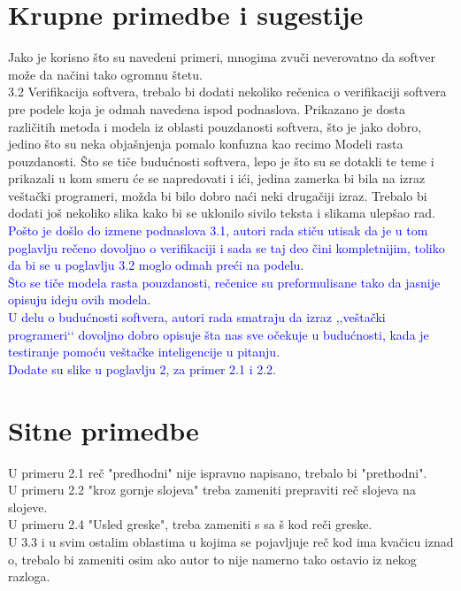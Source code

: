 \documentclass[a4paper]{report}
\newcommand{\odgovor}[1]{\textcolor{blue}{#1}}
\begin{document}
\section{Krupne primedbe i sugestije}
Jako je korisno što su navedeni primeri, mnogima zvuči neverovatno da softver može da načini tako ogromnu štetu.\\
3.2 Verifikacija softvera, trebalo bi dodati nekoliko rečenica o verifikaciji softvera pre podele koja je odmah navedena ispod podnaslova. Prikazano je dosta različitih metoda i modela iz oblasti pouzdanosti softvera, što je jako dobro, jedino što su neka objašnjenja pomalo konfuzna kao recimo Modeli rasta pouzdanosti. Što se tiče budućnosti softvera, lepo je što su se dotakli te teme i prikazali u kom smeru će se napredovati i ići, jedina zamerka bi bila na izraz veštački programeri, možda bi bilo dobro naći neki drugačiji izraz. Trebalo bi dodati još nekoliko slika kako bi se uklonilo sivilo teksta i slikama ulepšao rad.
\\

\odgovor{
Pošto je došlo do izmene podnaslova 3.1, autori rada stiču utisak da je u tom poglavlju rečeno dovoljno o verifikaciji i sada se taj deo čini kompletnijim, toliko da bi se u poglavlju 3.2 moglo odmah preći na podelu.\\
Što se tiče modela rasta pouzdanosti, rečenice su preformulisane tako da jasnije opisuju ideju ovih modela.\\
U delu o budućnosti softvera, autori rada smatraju da izraz ,,veštački programeri‘‘ dovoljno dobro opisuje šta nas sve očekuje u budućnosti, kada je testiranje pomoću veštačke inteligencije u pitanju.\\
Dodate su slike u poglavlju 2, za primer 2.1 i 2.2.
}

\section{Sitne primedbe}
U primeru 2.1 reč "predhodni" nije ispravno napisano, trebalo bi "prethodni".\\
U primeru 2.2 "kroz gornje slojeva" treba zameniti prepraviti reč slojeva na slojeve.\\
U primeru 2.4 "Usled greske", treba zameniti s sa š kod reči greske.\\
U 3.3 i u svim ostalim oblastima u kojima se pojavljuje reč kod ima kvačicu iznad o, trebalo bi zameniti osim ako autor to nije namerno tako ostavio iz nekog razloga.\\
\end{document}
